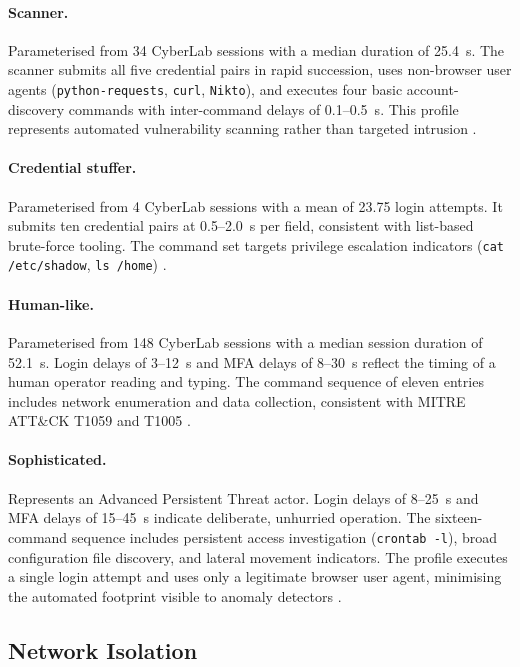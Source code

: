 \paragraph{Scanner.}
Parameterised from 34 CyberLab sessions with a median duration of 25.4~s.
The scanner submits all five credential pairs in rapid succession, uses
non-browser user agents (\texttt{python-requests}, \texttt{curl},
\texttt{Nikto}), and executes four basic account-discovery commands with
inter-command delays of 0.1–0.5~s. This profile represents automated
vulnerability scanning rather than targeted intrusion
\cite{Bringer2012HoneypotSurvey}.

\paragraph{Credential stuffer.}
Parameterised from 4 CyberLab sessions with a mean of 23.75 login attempts.
It submits ten credential pairs at 0.5–2.0~s per field, consistent with
list-based brute-force tooling. The command set targets privilege escalation
indicators (\texttt{cat /etc/shadow}, \texttt{ls /home})
\cite{Bailey2009Botnets}.

\paragraph{Human-like.}
Parameterised from 148 CyberLab sessions with a median session duration of
52.1~s. Login delays of 3–12~s and MFA delays of 8–30~s reflect the timing of
a human operator reading and typing. The command sequence of eleven entries
includes network enumeration and data collection, consistent with MITRE ATT\&CK
T1059 and T1005 \cite{Holz2006AttackPatterns}.

\paragraph{Sophisticated.}
Represents an Advanced Persistent Threat actor. Login delays of 8–25~s and
MFA delays of 15–45~s indicate deliberate, unhurried operation. The
sixteen-command sequence includes persistent access investigation
(\texttt{crontab -l}), broad configuration file discovery, and lateral movement
indicators. The profile executes a single login attempt and uses only a
legitimate browser user agent, minimising the automated footprint visible to
anomaly detectors \cite{Freiling2010Evasion}.

\subsection{Network Isolation}


